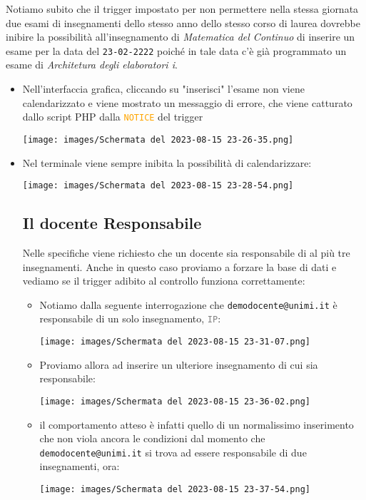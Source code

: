 \documentclass{article}
\newcommand{\attr}[1]{\texttt{\textcolor{gray}{#1}}}
\newcommand{\sqlcommand}[1]{\texttt{\textcolor{orange}{#1}}}
\newcommand{\und}[0]{\textunderscore}
\begin{document}
Notiamo subito che il trigger impostato per non permettere nella stessa giornata due esami di insegnamenti dello stesso anno dello stesso corso di laurea dovrebbe inibire la possibilità all'insegnamento di \textit{Matematica del Continuo} di inserire un esame per la data del \texttt{23-02-2222} poiché in tale data c'è già programmato un esame di \textit{Architetura degli elaboratori i}.
\begin{itemize}
    \item Nell'interfaccia grafica, cliccando su "inserisci" l'esame non viene calendarizzato e viene mostrato un messaggio di errore, che viene catturato dallo script PHP dalla \sqlcommand{NOTICE} del trigger

    \texttt{[image: images/Schermata del 2023-08-15 23-26-35.png]}

    \item Nel terminale viene sempre inibita la possibilità di calendarizzare:

    \texttt{[image: images/Schermata del 2023-08-15 23-28-54.png]}

    \subsection{Il docente Responsabile}
    Nelle specifiche viene richiesto che un docente sia responsabile di al più tre insegnamenti. Anche in questo caso proviamo a forzare la base di dati e vediamo se il trigger adibito al controllo funziona correttamente:
    \begin{itemize}
        \item Notiamo dalla seguente interrogazione che \texttt{demo\und docente@unimi.it} è responsabile di un solo insegnamento, \attr{IP}:

        \texttt{[image: images/Schermata del 2023-08-15 23-31-07.png]}

        \item Proviamo allora ad inserire un ulteriore insegnamento di cui sia responsabile:

        \texttt{[image: images/Schermata del 2023-08-15 23-36-02.png]}

        \item il comportamento atteso è infatti quello di un normalissimo inserimento che non viola ancora le condizioni dal momento che \texttt{demo\und docente@unimi.it} si trova ad essere responsabile di due insegnamenti, ora:

        \texttt{[image: images/Schermata del 2023-08-15 23-37-54.png]}


\end{itemize}
\end{itemize}
\end{document}
